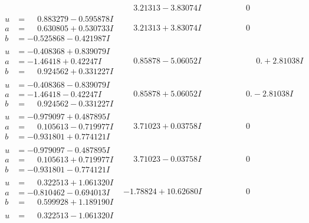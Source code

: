 \documentclass[1p]{elsarticle_modified}
\theoremstyle{definition}
\begin{document}
$$\begin{array}{c|c|c}
 & \phantom{-}3.21313 - 3.83074 I & \phantom{-0.000000 } 0 \\ \hline\begin{aligned}
u &= \phantom{-}0.883279 - 0.595878 I \\
a &= \phantom{-}0.630805 + 0.530733 I \\
b &= -0.525868 - 0.421987 I\end{aligned}
 & \phantom{-}3.21313 + 3.83074 I & \phantom{-0.000000 } 0 \\ \hline\begin{aligned}
u &= -0.408368 + 0.839079 I \\
a &= -1.46418 + 0.42247 I \\
b &= \phantom{-}0.924562 + 0.331227 I\end{aligned}
 & \phantom{-}0.85878 - 5.06052 I & \phantom{-0.000000 -}0. + 2.81038 I \\ \hline\begin{aligned}
u &= -0.408368 - 0.839079 I \\
a &= -1.46418 - 0.42247 I \\
b &= \phantom{-}0.924562 - 0.331227 I\end{aligned}
 & \phantom{-}0.85878 + 5.06052 I & \phantom{-0.000000 } 0. - 2.81038 I \\ \hline\begin{aligned}
u &= -0.979097 + 0.487895 I \\
a &= \phantom{-}0.105613 - 0.719977 I \\
b &= -0.931801 + 0.774121 I\end{aligned}
 & \phantom{-}3.71023 + 0.03758 I & \phantom{-0.000000 } 0 \\ \hline\begin{aligned}
u &= -0.979097 - 0.487895 I \\
a &= \phantom{-}0.105613 + 0.719977 I \\
b &= -0.931801 - 0.774121 I\end{aligned}
 & \phantom{-}3.71023 - 0.03758 I & \phantom{-0.000000 } 0 \\ \hline\begin{aligned}
u &= \phantom{-}0.322513 + 1.061320 I \\
a &= -0.810462 - 0.694013 I \\
b &= \phantom{-}0.599928 + 1.189190 I\end{aligned}
 & -1.78824 + 10.62680 I & \phantom{-0.000000 } 0 \\ \hline\begin{aligned}
u &= \phantom{-}0.322513 - 1.061320 I \\

\end{aligned}
\end{array}$$
\end{document}
